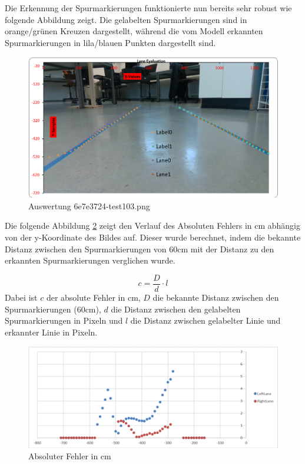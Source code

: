 \documentclass{article}
\begin{document}
            Die Erkennung der Spurmarkierungen funktionierte nun bereits sehr robust wie folgende Abbildung zeigt.
            Die gelabelten Spurmarkierungen sind in orange/grünen Kreuzen dargestellt, während die vom Modell erkannten Spurmarkierungen in lila/blauen Punkten dargestellt sind.
            \begin{figure}[h!]
                \includegraphics[width=\linewidth]{Auswertung_6e7e3724-test_103.png}
                \caption{Auswertung 6e7e3724-test103.png}
                \label{fig:Auswertung_6e7e3724-test_103.png}
            \end{figure}
            Die folgende Abbildung \ref{fig:AbsoluterFehlerCm} zeigt den Verlauf des Absoluten Fehlers in cm abhängig von der y-Koordinate des Bildes auf.
            Dieser wurde berechnet, indem die bekannte Distanz zwischen den Spurmarkierungen von 60cm mit der Distanz zu den erkannten Spurmarkierungen verglichen wurde.

            \begin{equation}
                 c = \frac{D}{d} \cdot l
            \end{equation}
            Dabei ist $c$ der absolute Fehler in cm, $D$ die bekannte Distanz zwischen den Spurmarkierungen (60cm), $d$ die Distanz zwischen den gelabelten Spurmarkierungen in Pixeln und $l$ die Distanz zwischen gelabelter Linie und erkannter Linie in Pixeln.

            \begin{figure}[h!]
                \includegraphics[width=\linewidth]{Auswertung_6e7e3724-test_103_absolut.png}
                \caption{Absoluter Fehler in cm}
                \label{fig:AbsoluterFehlerCm}
            \end{figure}
\end{document}
